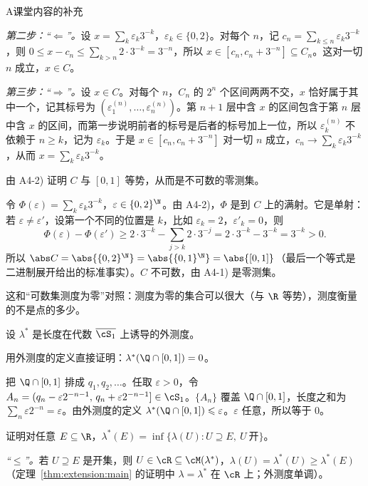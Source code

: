 \begin{exercises}{A}{课堂内容的补充}
\begin{questions}
\begin{solution}
\emph{第二步：“$\Leftarrow$”。}设 $x=\sum_k\varepsilon_k3^{-k}$，$\varepsilon_k\in\{0,2\}$。对每个 $n$，记 $c_n=\sum_{k\leqslant n}\varepsilon_k3^{-k}$，则 $0\leqslant x-c_n\leqslant\sum_{k>n}2\cdot3^{-k}=3^{-n}$，所以 $x\in[c_n,c_n+3^{-n}]\subseteq C_n$。这对一切 $n$ 成立，$x\in C$。

\emph{第三步：“$\Rightarrow$”。}设 $x\in C$。对每个 $n$，$C_n$ 的 $2^n$ 个区间两两不交，$x$ 恰好属于其中一个，记其标号为 $(\varepsilon_1^{(n)},\dots,\varepsilon_n^{(n)})$。第 $n+1$ 层中含 $x$ 的区间包含于第 $n$ 层中含 $x$ 的区间，而第一步说明前者的标号是后者的标号加上一位，所以 $\varepsilon_k^{(n)}$ 不依赖于 $n\geqslant k$，记为 $\varepsilon_k$。于是 $x\in[c_n,c_n+3^{-n}]$ 对一切 $n$ 成立，$c_n\to\sum_k\varepsilon_k3^{-k}$，从而 $x=\sum_k\varepsilon_k3^{-k}$。
\end{solution}
\item 由 A4-2) 证明 $C$ 与 $[0,1]$ 等势，从而是不可数的零测集。
\begin{solution}
令 $\Phi(\varepsilon)=\sum_k\varepsilon_k3^{-k}$，$\varepsilon\in\{0,2\}^\N$。由 A4-2)，$\Phi$ 是到 $C$ 上的满射。它是单射：若 $\varepsilon\neq\varepsilon'$，设第一个不同的位置是 $k$，比如 $\varepsilon_k=2$，$\varepsilon'_k=0$，则
\[
\Phi(\varepsilon)-\Phi(\varepsilon')\geqslant2\cdot3^{-k}-\sum_{j>k}2\cdot3^{-j}=2\cdot3^{-k}-3^{-k}=3^{-k}>0.
\]
所以 $\abs C=\abs{\{0,2\}^\N}=\abs{\{0,1\}^\N}=\abs{[0,1]}$（最后一个等式是二进制展开给出的标准事实）。$C$ 不可数，由 A4-1) 是零测集。

这和“可数集测度为零”对照：测度为零的集合可以很大（与 $\R$ 等势），测度衡量的不是点的多少。
\end{solution}
\end{questions}

\item\label{ex:extension:A5} 设 $\lambda^*$ 是长度在代数 $\overline{\cS_1}$ 上诱导的外测度。
\begin{questions}
\item 用外测度的定义直接证明：$\lambda^*(\Q\cap[0,1])=0$。
\begin{solution}
把 $\Q\cap[0,1]$ 排成 $q_1,q_2,\dots$。任取 $\varepsilon>0$，令 $A_n=(q_n-\varepsilon2^{-n-1},\,q_n+\varepsilon2^{-n-1}]\in\cS_1$。$\{A_n\}$ 覆盖 $\Q\cap[0,1]$，长度之和为 $\sum_n\varepsilon2^{-n}=\varepsilon$。由外测度的定义 $\lambda^*(\Q\cap[0,1])\leqslant\varepsilon$。$\varepsilon$ 任意，所以等于 $0$。
\end{solution}
\item 证明对任意 $E\subseteq\R$，$\lambda^*(E)=\inf\{\lambda(U): U\supseteq E,\ U\ \text{开}\}$。
\begin{solution}
\emph{“$\leqslant$”。}若 $U\supseteq E$ 是开集，则 $U\in\cR\subseteq\cM(\lambda^*)$，$\lambda(U)=\lambda^*(U)\geqslant\lambda^*(E)$（定理~\ref{thm:extension:main} 的证明中 $\lambda=\lambda^*$ 在 $\cR$ 上；外测度单调）。


\end{solution}
\end{questions}
\end{exercises}
